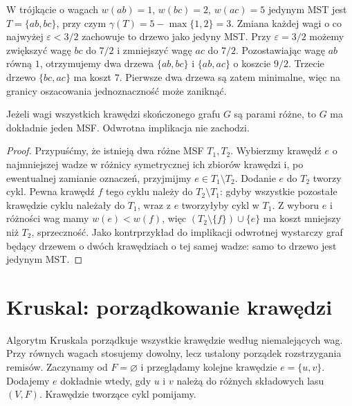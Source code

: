 \begin{przyklad}
\label{ex:tg-mst-stability-gap}
W trójkącie o wagach
$w(ab)=1$, $w(bc)=2$,
$w(ac)=5$ jedynym MST
jest $T=\{ab,bc\}$, przy czym
$\gamma(T)=5-\max\{1,2\}=3$.
Zmiana każdej wagi o co
najwyżej $\varepsilon<3/2$
zachowuje to drzewo jako
jedyny MST. Przy
$\varepsilon=3/2$ możemy
zwiększyć wagę $bc$ do
$7/2$ i zmniejszyć
wagę $ac$ do $7/2$.
Pozostawiając wagę $ab$ równą $1$, otrzymujemy dwa
drzewa $\{ab,bc\}$ i $\{ab,ac\}$ o koszcie $9/2$.
Trzecie drzewo $\{bc,ac\}$ ma koszt $7$.
Pierwsze dwa drzewa są zatem minimalne, więc
na granicy oszacowania jednoznaczność może zaniknąć.
\end{przyklad}

\begin{stwierdzenie}
\label{prop:tg-mst-unique}
Jeżeli wagi wszystkich krawędzi skończonego
grafu $G$ są parami różne, to $G$ ma dokładnie
jeden MSF. Odwrotna implikacja nie zachodzi.
\end{stwierdzenie}
\begin{proof}
Przypuśćmy, że istnieją dwa różne MSF $T_1,T_2$.
Wybierzmy krawędź $e$ o najmniejszej wadze
w różnicy symetrycznej ich zbiorów krawędzi
i, po ewentualnej zamianie oznaczeń, przyjmijmy
$e\in T_1\setminus T_2$.
Dodanie $e$ do $T_2$ tworzy cykl. Pewna krawędź
$f$ tego cyklu należy do $T_2\setminus T_1$:
gdyby wszystkie pozostałe krawędzie cyklu
należały do $T_1$, wraz z $e$ tworzyłyby
cykl w $T_1$. Z wyboru $e$ i różności wag
mamy $w(e)<w(f)$, więc
$(T_2\setminus\{f\})\cup\{e\}$
ma koszt mniejszy niż $T_2$, sprzeczność.
Jako kontrprzykład do implikacji odwrotnej
wystarczy graf będący drzewem o dwóch
krawędziach o tej samej wadze: samo to drzewo
jest jedynym MST.
\end{proof}

\section{Kruskal: porządkowanie krawędzi}
\label{sec:tg-mst-kruskal}

Algorytm Kruskala porządkuje wszystkie krawędzie
według niemalejących wag. Przy równych wagach
stosujemy dowolny, lecz ustalony porządek
rozstrzygania remisów. Zaczynamy od
$F=\varnothing$ i przeglądamy kolejne krawędzie
$e=\{u,v\}$. Dodajemy $e$ dokładnie wtedy,
gdy $u$ i $v$ należą do różnych składowych
lasu $(V,F)$. Krawędzie tworzące cykl pomijamy.

